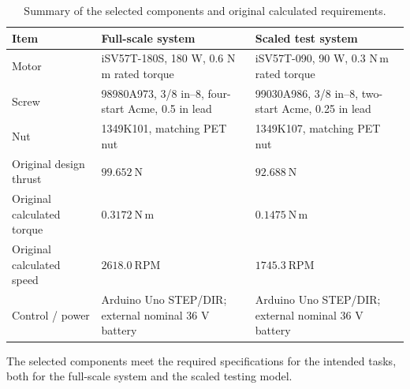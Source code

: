 \documentclass[11pt]{article}
\begin{document}
\begin{table}[h!]
\centering
\begin{tabularx}{\textwidth}{@{}l Y Y@{}}
\toprule
\textbf{Item} & \textbf{Full-scale system} & \textbf{Scaled test system} \\
\midrule
Motor & iSV57T-180S, 180 W, 0.6 N\,m rated torque & iSV57T-090, 90 W, 0.3 N\,m rated torque \\
Screw & 98980A973, 3/8 in--8, four-start Acme, 0.5 in lead & 99030A986, 3/8 in--8, two-start Acme, 0.25 in lead \\
Nut & 1349K101, matching PET nut & 1349K107, matching PET nut \\
Original design thrust & $99.652\ \mathrm{N}$ & $92.688\ \mathrm{N}$ \\
Original calculated torque & $0.3172\ \mathrm{N\,m}$ & $0.1475\ \mathrm{N\,m}$ \\
Original calculated speed & $2618.0\ \mathrm{RPM}$ & $1745.3\ \mathrm{RPM}$ \\
Control / power & Arduino Uno STEP/DIR; external nominal 36 V battery & Arduino Uno STEP/DIR; external nominal 36 V battery \\
\bottomrule
\end{tabularx}
\caption{Summary of the selected components and original calculated requirements.}
\end{table}

The selected components meet the required specifications for the intended
tasks, both for the full-scale system and the scaled testing model.

\newpage
\end{document}
